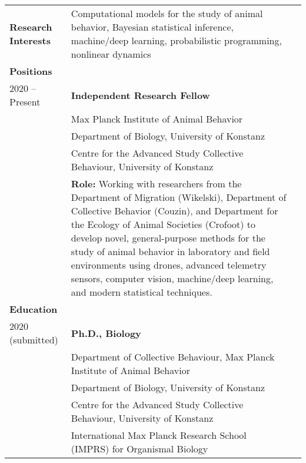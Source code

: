 \documentclass[letterpaper,6pt,oneside]{article}
\begin{document}
\begin{small}
\noindent \begin{longtable}{@{} l p{5.3in}l}

\large{\textbf{Research Interests}}
& Computational models for the study of animal behavior, Bayesian statistical inference, machine/deep learning, probabilistic programming, nonlinear dynamics \vspace{2mm}\\ 

\Large{\textbf{Positions}} \vspace{5mm} \\
\large{2020 -- Present} 
& \textbf{Independent Research Fellow} \\
& {Max Planck Institute of Animal Behavior} \\
& {Department of Biology, University of Konstanz} \\
& {Centre for the Advanced Study Collective Behaviour, University of Konstanz} \vspace{0.5mm} \\
& \textbf{Role:} Working with researchers from the Department of Migration (Wikelski), Department of Collective Behavior (Couzin), and Department for the Ecology of Animal Societies (Crofoot) to develop novel, general-purpose methods for the study of animal behavior in laboratory and field environments using drones, advanced telemetry sensors, computer vision, machine/deep learning, and modern statistical techniques. \\

\Large{\textbf{Education}} \vspace{5mm} \\
 \large{2020 (submitted)} 
 & \textbf{Ph.D., Biology} \\
 & {Department of Collective Behaviour, Max Planck Institute of Animal Behavior} \\
  & {Department of Biology, University of Konstanz} \\
    & {Centre for the Advanced Study Collective Behaviour, University of Konstanz} \\
 	& {International Max Planck Research School (IMPRS) for Organismal Biology} \\
     

\end{longtable}
\end{small}
\end{document}
